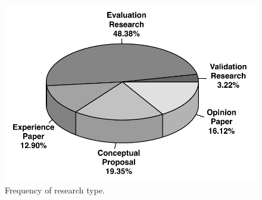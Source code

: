  \begin{figure}[!h]
 \centering
   \includegraphics[scale=0.45]{figuras/pieEvaluation}
 \caption{Frequency of research type.}
 \label{fig:pieEvaluation}
\end{figure} 










